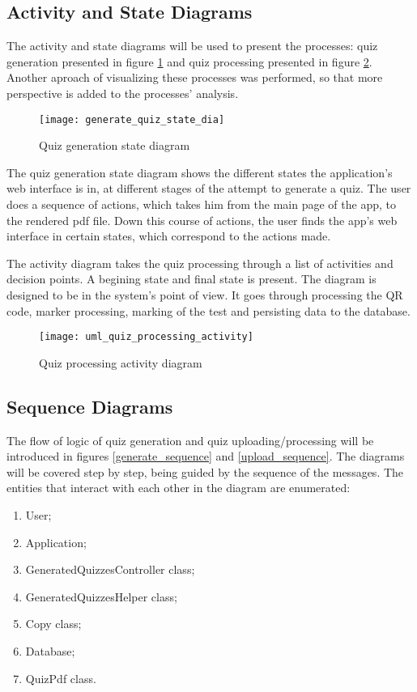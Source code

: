 \subsection{Activity and State Diagrams}
The activity and state diagrams will be used to present the processes: quiz generation presented in figure \ref{generation_state} and quiz processing presented in figure \ref{processing_activity}. Another aproach of visualizing these processes was performed, so that more perspective is added to the processes' analysis. 

\begin{figure}[!ht]
\centering
\texttt{[image: generate\_quiz\_state\_dia]}
\caption{Quiz generation state diagram}\label{generation_state}
\end{figure}

The quiz generation state diagram shows the different states the application's web interface is in, at different stages of the attempt to generate a quiz. The user does a sequence of actions, which takes him from the main page of the app, to the rendered pdf file. Down this course of actions, the user finds the app's web interface in certain states, which correspond to the actions made.

The activity diagram takes the quiz processing through a list of activities and decision points. A begining state and final state is present. The diagram is designed to be in the system's point of view. It goes through processing the QR code, marker processing, marking of the test and persisting data to the database.


\begin{figure}[!ht]
\centering
\texttt{[image: uml\_quiz\_processing\_activity]}
\caption{Quiz processing activity diagram}\label{processing_activity}
\end{figure}


\subsection{Sequence Diagrams}
The flow of logic of quiz generation and quiz uploading/processing will be introduced in figures \ref{generate_sequence} and \ref{upload_sequence}. The diagrams will be covered step by step, being guided by the sequence of the messages. The entities that interact with each other in the diagram are enumerated:
\begin{enumerate} 
  \item User;
  \item Application;
  \item GeneratedQuizzesController class;
  \item GeneratedQuizzesHelper class;
  \item Copy class;
  \item Database;
  \item QuizPdf class.
\end{enumerate}


